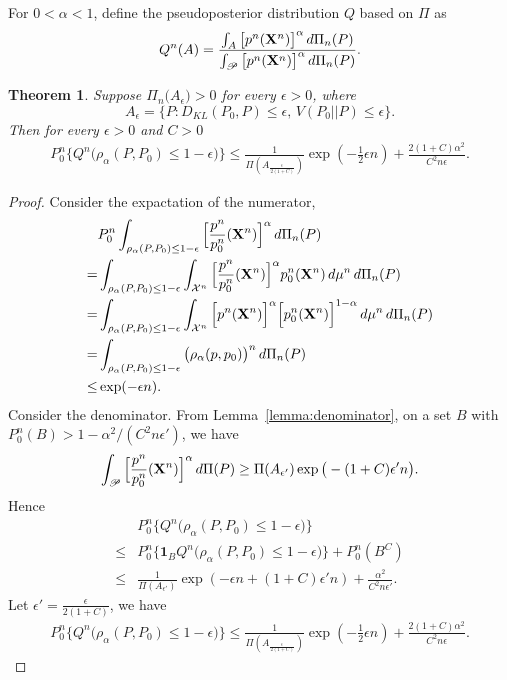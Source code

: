 \documentclass[3p]{elsarticle}
\theoremstyle{plain}
\newtheorem{theorem}{\quad\quad Theorem}
\theoremstyle{definition}
\theoremstyle{remark}
\begin{document}
For $0<\alpha<1$, define the pseudoposterior distribution $Q$ based on $\Pi$ as
$$
Q^n (A)=\frac{\int_{A} \big[p^n(\mathbf{X}^n)\big]^{\alpha}\, d\Pi_n(P)}{\int_{\mathscr{P}} \big[p^n(\mathbf{X}^n)\big]^{\alpha}\, d\Pi_n(P)}.
$$
\begin{theorem}
    Suppose $\Pi_n\Big(A_{\epsilon}\Big)>0$ for every $\epsilon>0$, where
    $$
    A_{\epsilon}=\{P: D_{KL}(P_0,P)\leq \epsilon, \, V(P_0 || P) \leq \epsilon\}.
    $$
    Then for every $\epsilon>0$ and $C>0$
     $$
     \begin{aligned}
         P_0^n \Big\{ Q^n\big( \rho_\alpha (P,P_0)\leq 1-\epsilon\big)\Big\}
         \leq \frac{1}{\Pi(A_{\frac{\epsilon}{2(1+C)}})}\exp (-\frac{1}{2}\epsilon n) +\frac{2(1+C)\alpha^2}{C^2n\epsilon}.
     \end{aligned}
     $$
\end{theorem}
\begin{proof}
Consider the expactation of the numerator,
    $$
    \begin{aligned}
        &P_0^n\int_{\rho_{\alpha}(P,P_0)\leq 1- \epsilon} \Big[ \frac{p^n}{p_0^n} (\mathbf{X}^n) \Big]^{\alpha} \, d \Pi_n(P)
        \\
        =&
        \int_{\rho_{\alpha}(P,P_0)\leq 1- \epsilon} \int_{\mathcal{X}^n}\Big[ \frac{p^n}{p_0^n} (\mathbf{X}^n) \Big]^{\alpha} p_0^n (\mathbf{X}^n)\, d\mu^n \, d \Pi_n(P)\\
        =&
        \int_{\rho_{\alpha}(P,P_0)\leq 1- \epsilon} \int_{\mathcal{X}^n}\Big[ {p^n} (\mathbf{X}^n) \Big]^{\alpha}  \Big[ p_0^n (\mathbf{X}^n) \Big]^{1-\alpha} \, d\mu^n \, d \Pi_n(P)\\
        =&
        \int_{\rho_{\alpha}(P,P_0)\leq 1- \epsilon} \big( \rho_{\alpha}(p,p_0) \big)^n \, d \Pi_n(P)\\
        \leq&
        \exp (-\epsilon n).
    \end{aligned}
    $$
    Consider the denominator.
     From Lemma~\ref{lemma:denominator}, on a set $B$ with $P_0^n(B)>1-\alpha^2/(C^2 n \epsilon')$, we have
     $$
     \int_{\mathscr{P}}\Big[\frac{p^n}{p_0^n}(\mathbf{X}^n)\Big]^{\alpha} \, d\Pi(P)
     \geq \Pi(A_{\epsilon'}) \exp \big(-(1+C)\epsilon' n\big).
     $$
     Hence 
     $$
     \begin{aligned}
         &P_0^n \Big\{ Q^n\big( \rho_\alpha (P,P_0)\leq 1-\epsilon\big)\Big\}\\
         \leq&P_0^n \Big\{ \mathbf{1}_{B} Q^n\big( \rho_\alpha (P,P_0)\leq 1-\epsilon\big)\Big\}+P_0^n (B^C)\\
         \leq& \frac{1}{\Pi(A_{\epsilon'})}\exp (-\epsilon n+(1+C)\epsilon' n) +\frac{\alpha^2}{C^2n\epsilon'}.
     \end{aligned}
     $$
     Let $\epsilon'=\frac{\epsilon}{2(1+C)}$, we have
     $$
     \begin{aligned}
         P_0^n \Big\{ Q^n\big( \rho_\alpha (P,P_0)\leq 1-\epsilon\big)\Big\}
         \leq \frac{1}{\Pi(A_{\frac{\epsilon}{2(1+C)}})}\exp (-\frac{1}{2}\epsilon n) +\frac{2(1+C)\alpha^2}{C^2n\epsilon}.
     \end{aligned}
     $$
\end{proof}
\end{document}
